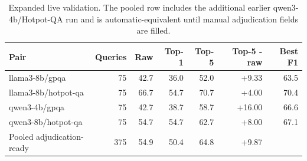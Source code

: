 \begin{table}[t]
\centering
\begin{tabular}{lrrrrrr}
\toprule
Pair & Queries & Raw & Top-1 & Top-5 & Top-5 - raw & Best F1 \\
\midrule
llama3-8b/gpqa & 75 & 42.7 & 36.0 & 52.0 & +9.33 & 63.5 \\
llama3-8b/hotpot-qa & 75 & 66.7 & 54.7 & 70.7 & +4.00 & 70.4 \\
qwen3-4b/gpqa & 75 & 42.7 & 38.7 & 58.7 & +16.00 & 66.6 \\
qwen3-8b/hotpot-qa & 75 & 54.7 & 54.7 & 62.7 & +8.00 & 67.1 \\
Pooled adjudication-ready & 375 & 54.9 & 50.4 & 64.8 & +9.87 &  \\
\bottomrule
\end{tabular}
\caption{Expanded live validation. The pooled row includes the additional earlier qwen3-4b/Hotpot-QA run and is automatic-equivalent until manual adjudication fields are filled.}
\label{tab:ngc\_live\_validation}
\end{table}
